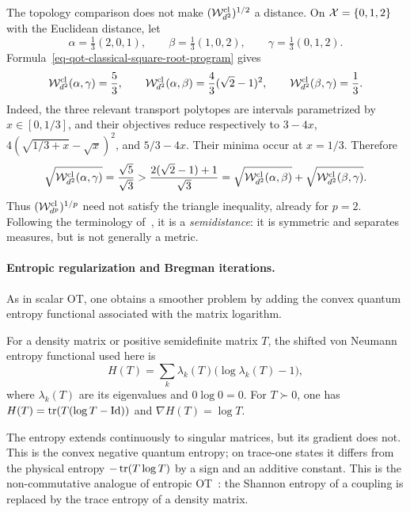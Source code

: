 \begin{example}\label{ex-classical-square-root-triangle-failure}
	The topology comparison does not make $(\mathcal W_{d^2}^{\mathrm{cl}})^{1/2}$ a distance. On $\mathcal{X}=\{0,1,2\}$ with the Euclidean distance, let
	\[
		\alpha=\tfrac13(2,0,1),
		\qquad
		\beta=\tfrac13(1,0,2),
		\qquad
		\gamma=\tfrac13(0,1,2).
	\]
	Formula~\eqref{eq-qot-classical-square-root-program} gives
	\[
		\mathcal W_{d^2}^{\mathrm{cl}}(\alpha,\gamma)=\frac53,
		\qquad
		\mathcal W_{d^2}^{\mathrm{cl}}(\alpha,\beta)=\frac43(\sqrt2-1)^2,
		\qquad
		\mathcal W_{d^2}^{\mathrm{cl}}(\beta,\gamma)=\frac13.
	\]
	Indeed, the three relevant transport polytopes are intervals parametrized by $x\in[0,1/3]$, and their objectives reduce respectively to $3-4x$, $4(\sqrt{1/3+x}-\sqrt x)^2$, and $5/3-4x$. Their minima occur at $x=1/3$. Therefore
	\[
		\sqrt{\mathcal W_{d^2}^{\mathrm{cl}}(\alpha,\gamma)}
		=
		\frac{\sqrt5}{\sqrt3}
		>
		\frac{2(\sqrt2-1)+1}{\sqrt3}
		=
		\sqrt{\mathcal W_{d^2}^{\mathrm{cl}}(\alpha,\beta)}
		+
		\sqrt{\mathcal W_{d^2}^{\mathrm{cl}}(\beta,\gamma)}.
	\]
	Thus $(\mathcal W_{d^p}^{\mathrm{cl}})^{1/p}$ need not satisfy the triangle inequality, already for $p=2$. Following the terminology of~\cite{ColeEcksteinFriedlandZyczkowski2023}, it is a \emph{semidistance}: it is symmetric and separates measures, but is not generally a metric.
\end{example}

\paragraph{Entropic regularization and Bregman iterations.}
As in scalar OT, one obtains a smoother problem by adding the convex quantum entropy functional associated with the matrix logarithm.

\begin{defn}\label{def-von-neumann-quantum-entropy}
	For a density matrix or positive semidefinite matrix $T$, the shifted von Neumann entropy functional used here is
	\[
		H(T)=\sum_k\lambda_k(T)\bigl(\log\lambda_k(T)-1\bigr),
	\]
	where $\lambda_k(T)$ are its eigenvalues and $0\log0=0$. For $T\succ0$, one has $H(T)=\operatorname{tr}(T(\log T-\mathrm{Id}))$ and $\nabla H(T)=\log T$.
\end{defn}
The entropy extends continuously to singular matrices, but its gradient does not. This is the convex negative quantum entropy; on trace-one states it differs from the physical entropy $-\operatorname{tr}(T\log T)$ by a sign and an additive constant.
This is the non-commutative analogue of entropic OT~\cite{2016-peyre-qot,chakrabarti2019quantum}: the Shannon entropy of a coupling is replaced by the trace entropy of a density matrix.

